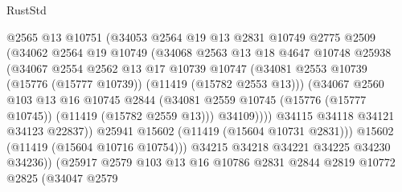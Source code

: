 \begin{lexlean}{RustStd}
\begin{coremodule}
                        @2565
                        @13
                        @10751
                        (@34053
                          @2564
                          @19
                          @13
                          @2831
                          @10749
                          @2775
                          @2509
                          (@34062
                            @2564
                            @19
                            @10749
                            (@34068
                              @2563
                              @13
                              @18
                              @4647
                              @10748
                              @25938
                              (@34067
                                @2554
                                @2562
                                @13
                                @17
                                @10739
                                @10747
                                (@34081
                                  @2553
                                  @10739
                                  (@15776 (@15777 @10739))
                                  (@11419 (@15782 @2553 @13)))
                                (@34067
                                  @2560
                                  @103
                                  @13
                                  @16
                                  @10745
                                  @2844
                                  (@34081
                                    @2559
                                    @10745
                                    (@15776 (@15777 @10745))
                                    (@11419 (@15782 @2559 @13)))
                                  @34109))))
                          @34115
                          @34118
                          @34121
                          @34123
                          @22837))
                      @25941
                      @15602
                      (@11419 (@15604 @10731 @2831)))
                    @15602
                    (@11419 (@15604 @10716 @10754)))
                  @34215
                  @34218
                  @34221
                  @34225
                  @34230
                  @34236))
              (@25917
                @2579
                @103
                @13
                @16
                @10786
                @2831
                @2844
                @2819
                @10772
                @2825
                (@34047
                  @2579

\end{coremodule}
\end{lexlean}
